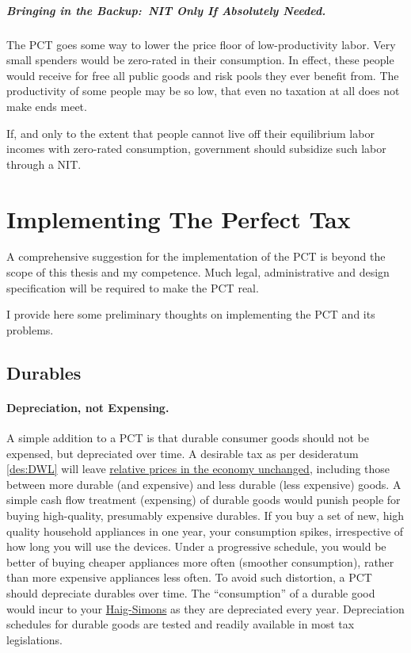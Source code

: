 \subparagraph{Bringing in the Backup:~NIT Only If Absolutely Needed.} The PCT goes some way to lower the price floor of low-productivity labor.
Very small spenders would be zero-rated in their consumption.
In effect, these people would receive for free all public goods and risk pools they ever benefit from.
The productivity of some people may be so low, that even no taxation at all does not make ends meet.

If, and only to the extent that people cannot live off their equilibrium labor incomes with zero-rated consumption, government should subsidize such labor through a NIT.

\section{Implementing The Perfect Tax} \label{sec:Implementation} A comprehensive suggestion for the implementation of the PCT is beyond the scope of this thesis and my competence.
Much legal, administrative and design specification will be required to make the PCT real.

I provide here some preliminary thoughts on implementing the PCT and its problems.

\subsection{Durables}
\paragraph{Depreciation, not Expensing.} A simple addition to a PCT is that durable consumer goods should not be expensed, but depreciated over time.
A desirable tax as per desideratum \ref{des:DWL} will leave \hyperref[des:DWL]{relative prices in the economy unchanged}, including those between more durable (and expensive) and less durable (less expensive) goods.
A simple cash flow treatment (expensing) of durable goods would punish people for buying high-quality, presumably expensive durables.
If you buy a set of new, high quality household appliances in one year, your consumption spikes, irrespective of how long you will use the devices.
Under a progressive schedule, you would be better of buying cheaper appliances more often (smoother consumption), rather than more expensive appliances less often.
To avoid such distortion, a PCT should depreciate durables over time.
The ``consumption'' of a durable good would incur to your \hyperref[eq:HaigSimonsPCT]{Haig-Simons} as they are depreciated every year.
Depreciation schedules for durable goods are tested and readily available in most tax legislations.

